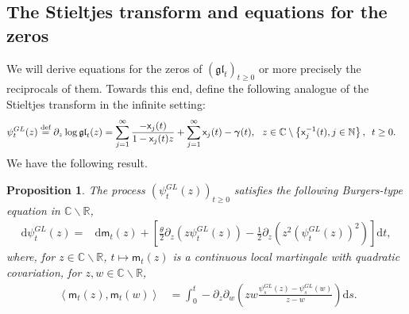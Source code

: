 \documentclass[]{article}
\newtheorem{prop}[thm]{Proposition}
\begin{document}
\subsection{The Stieltjes transform and equations for the zeros}

We will derive equations for the zeros of $(\mathfrak{gl}_t)_{t\ge 0}$ or more precisely the reciprocals of them. Towards this end, define the following analogue of the Stieltjes transform in the infinite setting:
\begin{align}\label{psi}
    \psi_t^{GL}(z)
    &\overset{\textnormal{def}}{=}
\partial_z
\log\mathfrak{gl}_t(z)
=
\sum_{j=1}^\infty
\frac{-\mathsf{x}_j(t)}{1-\mathsf{x}_j(t)z}
+ 
\sum_{j=1}^\infty\mathsf{x}_j(t)
-
\boldsymbol{\gamma}(t),
\  \ z\in \mathbb{C}\setminus
\left\{\mathsf{x}_j^{-1}(t), j\in\mathbb{N}\right\}, \ \,t\ge 0.
\end{align}
We have the following result.

\begin{prop}\label{PropStieltjesGL}
The process $(\psi_t^{GL}(z))_{t\ge 0}$ satisfies the following Burgers-type equation in $\mathbb{C}\backslash \mathbb{R}$,
\begin{align}\label{psiEqu}
    \mathrm{d}\psi_t^{GL}(z)
    =&
\mathrm{d}\mathsf{m}_t\left(z\right)
    +\left[\frac{\theta}{2}\partial_z\left(z\psi_t^{GL}(z)\right)
    -
    \frac{1}{2}\partial_z
    \left(z^2\left(\psi_t^{GL}(z)\right)^2\right)\right]\mathrm{d}t,
\end{align}
where, for $z\in\mathbb{C}\backslash \mathbb{R}$, 
$t\mapsto\mathsf{m}_t(z)$ is a continuous local martingale 
with quadratic covariation, for $z,w \in \mathbb{C}\backslash \mathbb{R}$,
\begin{align}
\label{d(m(z),m(z'))}
\
    \left\langle\mathsf{m}_t(z),
    \mathsf{m}_t(w)\right\rangle
&=
\int_0^t-\partial_z\partial_w \left( zw\frac{\psi_s^{GL}(z)-\psi_s^{GL}(w)}{z-w}\right)\mathrm{d}s.
\end{align}    
\end{prop}
\end{document}
